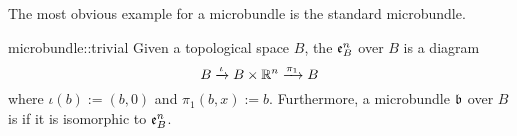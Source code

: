 \begin{myparagraph}
    The most obvious example for a microbundle is the standard microbundle.
\end{myparagraph}

\begin{myexample}{microbundle::trivial}{}
    Given a topological space $B$, the  $\mathfrak{e}^{n}_{B}$ over $B$ is a diagram
    \[ B \xrightarrow{\iota} B \times \mathbb{R}^n \xrightarrow{\pi_1} B{} \]
    where $\iota(b) := (b, 0)$ and $\pi_1(b, x) := b$.
    Furthermore, a microbundle $\mathfrak{b}$ over $B$ is  if it is isomorphic to $\mathfrak{e}^{n}_{B}$.
\end{myexample}